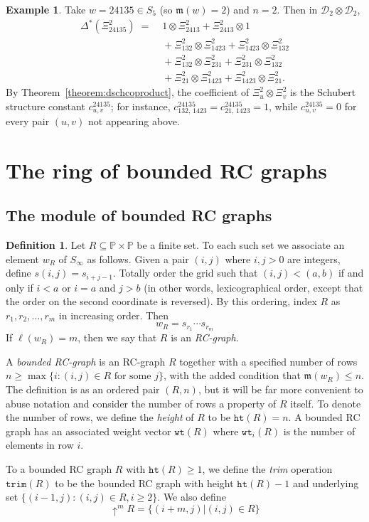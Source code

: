 \documentclass{amsart}
\theoremstyle{definition}
\newtheorem{definition}[lemma]{Definition}
\newtheorem{example}[lemma]{Example}
\theoremstyle{remark}
\numberwithin{equation}{subsection}
\newcommand{\shup}{{\uparrow}}
\newcommand{\wof}[1]{w_{#1}}
\newcommand{\wtt}{\mathtt{wt}}
\newcommand{\trm}{\mathtt{trim}}
\newcommand{\hr}{\mathtt{ht}}
\newcommand{\dsch}{\ensuremath{\Xi}}
\newcommand{\dcoma}{\mathcal{D}}
\newcommand{\maxd}{\mathfrak{m}}
\begin{document}
\begin{example}\label{example:dschcoproduct}
Take $w=24135\in S_5$ (so $\maxd(w)=2$) and $n=2$. Then in $\dcoma_2\otimes\dcoma_2$,
\begin{align*}
\Delta^*(\dsch_{24135}^2) \;=\;& 1\otimes \dsch_{2413}^2 + \dsch_{2413}^2\otimes 1\\
&{}+ \dsch_{132}^2\otimes \dsch_{1423}^2 + \dsch_{1423}^2\otimes \dsch_{132}^2\\
&{}+ \dsch_{132}^2\otimes \dsch_{231}^2 + \dsch_{231}^2\otimes \dsch_{132}^2\\
&{}+ \dsch_{21}^2\otimes \dsch_{1423}^2 + \dsch_{1423}^2\otimes \dsch_{21}^2.
\end{align*}
By Theorem~\ref{theorem:dschcoproduct}, the coefficient of $\dsch_u^2\otimes\dsch_v^2$ is the Schubert structure constant $c_{u,v}^{24135}$; for instance, $c_{132,\,1423}^{24135} = c_{21,\,1423}^{24135} = 1$, while $c_{u,v}^{24135}=0$ for every pair $(u,v)$ not appearing above.
\end{example}


\section{The ring of bounded RC graphs}\label{section:brc}

\subsection{The module of bounded RC graphs}

\begin{definition}\label{definition:rcgraph}
	Let $R\subseteq \mathbb{P}\times \mathbb{P}$ be a finite set. To each such set we associate an element $\wof{R}$ of $S_\infty$ as follows. Given a pair $(i, j)$ where $i,j>0$ are integers, define $s(i,j) = s_{i+j - 1}$. Totally order the grid such that $(i, j) < (a, b)$ if and only if $i < a$ or $i = a$ and $j > b$ (in other words, lexicographical order, except that the order on the second coordinate is reversed). By this ordering, index $R$ as $r_1, r_2,\ldots, r_m$ in increasing order. Then
	$$\wof{R} = s_{r_1}\cdots s_{r_m}$$
	If $\ell(\wof{R}) = m$, then we say that $R$ is an \emph{RC-graph}.
	
	A \emph{bounded RC-graph} is an RC-graph $R$ together with a specified number of rows $n\geq \max\{i: (i,j)\in R\text{ for some }j\}$, with the added condition that $\maxd(\wof{R})\leq n$. The definition is as an ordered pair $(R, n)$, but it will be far more convenient to abuse notation and consider the number of rows a property of $R$ itself. To denote the number of rows, we define the \emph{height} of $R$ to be $\hr(R)=n$. A bounded RC graph has an associated weight vector $\wtt(R)$ where $\wtt_i(R)$ is the number of elements in row $i$.

  
	
	To a bounded RC graph $R$ with $\hr(R)\geq 1$, we define the \emph{trim} operation $\trm(R)$ to be the bounded RC graph with height $\hr(R)-1$ and underlying set $\{(i-1, j): (i,j)\in R, i\geq 2\}$. We also define
	$$\shup^m R=\{(i+m, j)| (i,j)\in R\}$$
\end{definition}
\end{document}
